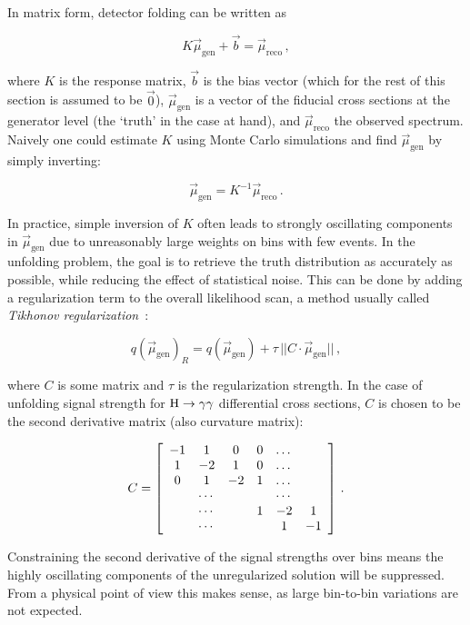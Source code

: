 In matrix form, detector folding can be written as
% 
\begin{linenomath*}
\begin{equation}
K \vec{\mu}_{\text{gen}} + \vec{b} = \vec{\mu}_{\text{reco}}
\,,
\end{equation}
\end{linenomath*}
%
where $K$ is the response matrix, $\vec{b}$ is the bias vector (which for the rest of this section is assumed to be $\vec{0}$), $\vec{\mu}_{\text{gen}}$ is a vector of the fiducial cross sections at the generator level (the `truth' in the case at hand), and $\vec{\mu}_{\text{reco}}$ the observed spectrum.
% 
Naively one could estimate $K$ using Monte Carlo simulations and find $\vec{\mu}_{\text{gen}}$ by simply inverting:
% 
\begin{linenomath*}
\begin{equation}
\vec{\mu}_{\text{gen}} = K^{-1} \vec{\mu}_{\text{reco}}
\,.
\end{equation}
\end{linenomath*}
%
In practice, simple inversion of $K$ often leads to strongly oscillating components in $\vec{\mu}_{\text{gen}}$ due to unreasonably large weights on bins with few events.
% 
% 
In the unfolding problem, the goal is to retrieve the truth distribution as accurately as possible, while reducing the effect of statistical noise.
% 
This can be done by adding a regularization term to the overall likelihood scan, a method usually called \textit{Tikhonov regularization}~\cite{Phillips:1962ofa,Tikhonov}:
% 
\begin{linenomath*}
\begin{equation}
q(\vec{\mu}_{\text{gen}})_R = q(\vec{\mu}_{\text{gen}}) + \tau \, || C \cdot \vec{\mu}_{\text{gen}} ||
\,,
\label{eq:likelihoodaddition}
\end{equation}
\end{linenomath*}
% 
where $C$ is some matrix and $\tau$ is the regularization strength. In the case of unfolding signal strength for $\mathrm{H}\to\mathrm{\gamma}\mathrm{\gamma}$ differential cross sections, $C$ is chosen to be the second derivative matrix (also curvature matrix):
% 
\begin{linenomath*}
\begin{equation}
C = \left[
\begin{array}{c c c c c c}
-1 & 1 & 0 & 0 & \dots &  \\
1 & -2 & 1 & 0 & \dots &  \\
0 & 1 & -2 & 1 & \dots &  \\
  & \cdots &   &   & \cdots &  \\
  & \cdots &   & 1 & -2 & 1 \\
  & \cdots &   &   & 1 & -1
\end{array}
\right]
\,.
\end{equation}
\end{linenomath*}
%
Constraining the second derivative of the signal strengths over bins means the highly oscillating components of the unregularized solution will be suppressed.
% 
From a physical point of view this makes sense, as large bin-to-bin variations are not expected.


